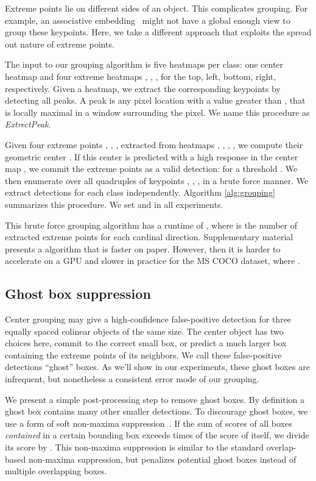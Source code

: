 \documentclass[10pt,twocolumn,letterpaper]{article}
\begin{document}
Extreme points lie on different sides of an object.
This complicates grouping.
For example, an associative embedding~\cite{newell2017associative} might not have a global enough view to group these keypoints.
Here, we take a different approach that exploits the spread out nature of extreme points.

The input to our grouping algorithm is five heatmaps per class: one center heatmap  and four extreme heatmaps , , ,  for the top, left, bottom, right, respectively.
Given a heatmap, we extract the corresponding keypoints by detecting all peaks.
A peak is any pixel location with a value greater than , that is locally maximal in a  window surrounding the pixel.
We name this procedure as \textit{ExtrectPeak}.

Given four extreme points , , ,  extracted from heatmaps , , , , we compute their geometric center .
If this center is predicted with a high response in the center map , we commit the extreme points as a valid detection:  for a threshold .
We then enumerate over all quadruples of keypoints , , ,  in a brute force manner.
We extract detections for each class independently.
Algorithm \ref{alg:grouping} summarizes this procedure.
We set  and  in all experiments.

This brute force grouping algorithm has a runtime of , where  is the number of extracted extreme points for each cardinal direction.
Supplementary material presents a  algorithm that is faster on paper.
However, then it is harder to accelerate on a GPU and slower in practice for the MS COCO dataset, where .

\subsection{Ghost box suppression}
\label{sec:ghost}
Center grouping may give a high-confidence false-positive detection for three equally spaced colinear objects of the same size.
The center object has two choices here, commit to the correct small box, or predict a much larger box containing the extreme points of its neighbors.
We call these false-positive detections ``ghost'' boxes.
As we'll show in our experiments, these ghost boxes are infrequent, but nonetheless a consistent error mode of our grouping.

We present a simple post-processing step to remove ghost boxes.
By definition a ghost box contains many other smaller detections.
To discourage ghost boxes, we use a form of soft non-maxima suppression~\cite{bodla2017soft}.
If the sum of scores of all boxes \emph{contained} in a certain bounding box exceeds  times of the score of itself,  we divide its score by .
This non-maxima suppression is similar to the standard overlap-based non-maxima suppression, but penalizes potential ghost boxes instead of multiple overlapping boxes.
\end{document}
